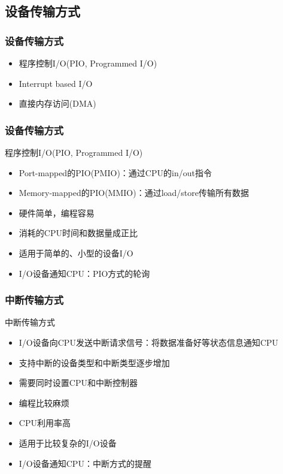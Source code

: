 \subsection{设备传输方式} %
\begin{frame}[fragile]
    \frametitle{设备传输方式}
        \begin{itemize}
            \item 程序控制I/O(PIO, Programmed I/O)
            \item Interrupt based I/O
            \item 直接内存访问(DMA)
        \end{itemize}
\end{frame}
\begin{frame}[fragile]
    \frametitle{设备传输方式}
    程序控制I/O(PIO, Programmed I/O)
    \begin{itemize}
        \item Port-mapped的PIO(PMIO)：通过CPU的in/out指令
        \item Memory-mapped的PIO(MMIO)：通过load/store传输所有数据
        \item 硬件简单，编程容易
        \item 消耗的CPU时间和数据量成正比
        \item 适用于简单的、小型的设备I/O
        \item I/O设备通知CPU：PIO方式的轮询
    \end{itemize}
\end{frame}
\begin{frame}[fragile]
    \frametitle{中断传输方式}
    中断传输方式
    \begin{itemize}
        \item I/O设备向CPU发送中断请求信号：将数据准备好等状态信息通知CPU
        \item 支持中断的设备类型和中断类型逐步增加
        \item 需要同时设置CPU和中断控制器
        \item 编程比较麻烦
        \item CPU利用率高
        \item 适用于比较复杂的I/O设备
        \item I/O设备通知CPU：中断方式的提醒
    \end{itemize}
\end{frame}

